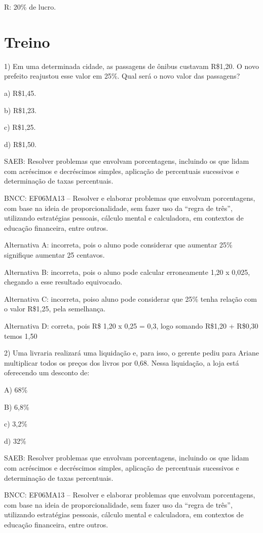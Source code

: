 R: 20\% de lucro.

\section{Treino}

1) Em uma determinada cidade, as passagens de ônibus custavam R\$1,20. O
novo prefeito reajustou esse valor em 25\%. Qual será o novo valor das
passagens?

a) R\$1,45.

b) R\$1,23.

c) R\$1,25.

d) R\$1,50.

SAEB: Resolver problemas que envolvam porcentagens, incluindo os que
lidam com acréscimos e decréscimos simples, aplicação de percentuais
sucessivos e determinação de taxas percentuais.

BNCC: EF06MA13 -- Resolver e elaborar problemas que envolvam
porcentagens, com base na ideia de proporcionalidade, sem fazer uso da
``regra de três'', utilizando estratégias pessoais, cálculo mental e
calculadora, em contextos de educação financeira, entre outros.

Alternativa A: incorreta, pois o aluno pode considerar que aumentar 25\%
signifique aumentar 25 centavos.

Alternativa B: incorreta, pois o aluno pode calcular erroneamente 1,20 x
0,025, chegando a esse resultado equivocado.

Alternativa C: incorreta, poiso aluno pode considerar que 25\% tenha
relação com o valor R\$1,25, pela semelhança.

Alternativa D: correta, pois R\$ 1,20 x 0,25 = 0,3, logo somando R\$1,20
+ R\$0,30 temos 1,50

2) Uma livraria realizará uma liquidação e, para isso, o gerente pediu
para Ariane multiplicar todos os preços dos livros por 0,68. Nessa
liquidação, a loja está oferecendo um desconto de:

A) 68\%

B) 6,8\%

c) 3,2\%

d) 32\%

SAEB: Resolver problemas que envolvam porcentagens, incluindo os que
lidam com acréscimos e decréscimos simples, aplicação de percentuais
sucessivos e determinação de taxas percentuais.

BNCC: EF06MA13 -- Resolver e elaborar problemas que envolvam
porcentagens, com base na ideia de proporcionalidade, sem fazer uso da
``regra de três'', utilizando estratégias pessoais, cálculo mental e
calculadora, em contextos de educação financeira, entre outros.


